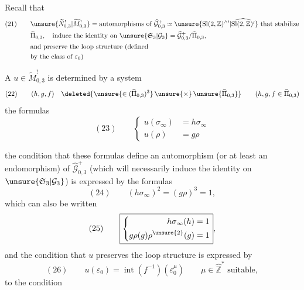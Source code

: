 
Recall that
\[
\begin{aligned}
(21)\qquad
&\unsure{\widetilde N_{0,3}^{!}|\widetilde M_{0,3}^{!}}
=\text{automorphisms of }\widehat{\mathcal G}_{0,3}^{+}
\simeq\unsure{\mathrm{Sl}(2,\mathbb Z)^{\wedge\prime}|\widehat{\mathrm{Sl}(2,\mathbb Z)^{\prime}}}
\text{ that stabilize}\\
&\widehat\Pi_{0,3},\quad\text{induce the identity on }
\unsure{\mathfrak S_3|\mathcal G_3}
=\widehat{\mathcal G}_{0,3}^{+}/\widehat\Pi_{0,3},\\
&\text{and preserve the loop structure (defined}\\
&\text{by the class of }\varepsilon_0\text{)}
\end{aligned}
\]

A $u\in\widetilde M_{0,3}^{!}$ is determined by a system
\[
(22)\qquad (h,g,f)\quad
\deleted{\unsure{\in(\widehat{\Pi}_{0,3})^{3}}\,\unsure{\times}\,\unsure{\widehat{\Pi}_{0,3}}}
\qquad(h,g,f\in\widehat\Pi_{0,3})
\]
 the formulas
\[
(23)\qquad
\left\{\begin{aligned}
u(\sigma_\infty)&=h\sigma_\infty\\
u(\rho)&=g\rho
\end{aligned}\right.
\]

the condition that these formulas define an automorphism (or at least an endomorphism) of $\widehat{\mathcal G}_{0,3}^{+}$ (which will necessarily induce the identity on $\unsure{\mathfrak S_3|\mathcal G_3}$) is expressed by the formulas
\[
(24)\qquad (h\sigma_\infty)^{2}=(g\rho)^{3}=1,
\]
which can also be written
\[
(25)\qquad
\boxed{\left\{\begin{aligned}
h\sigma_\infty(h)&=1\\
g\rho(g)\rho^{\unsure{2}}(g)&=1
\end{aligned}\right.},
\]
and the condition that $u$ preserves the loop structure is expressed by
\[
(26)\qquad u(\varepsilon_0)=\operatorname{int}(f^{-1})(\varepsilon_0^{\mu})
\qquad \mu\in\widehat{\mathbb Z}^{*}\text{ suitable},
\]
 to the condition


